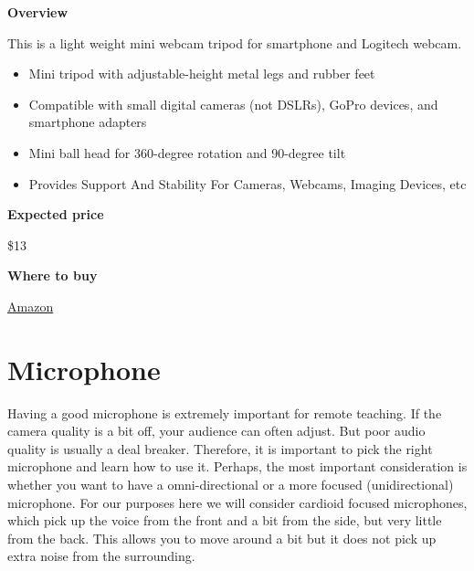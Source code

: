 \begin{gram}
\label{grm:equipment::tripod::mamawin::main}

\textbf{Overview}

This is a light weight mini webcam tripod for smartphone and Logitech webcam.
%
\begin{itemize}
\item
Mini tripod with adjustable-height metal legs and rubber feet

\item
Compatible with small digital cameras (not DSLRs), GoPro devices, and smartphone adapters 

\item
Mini ball head for 360-degree rotation and 90-degree tilt

\item
Provides Support And Stability For Cameras, Webcams, Imaging Devices, etc

\end{itemize}



\textbf{Expected price}

\$13

\textbf{Where to buy}

\href{https://www.amazon.com/Lightweight-Webcam-Tripod-Logitech-Camera/dp/B076SHC6RN/ref=sr_1_1_sspa?crid=2T6CQ3HNRR1XR&keywords=logitech+c920&qid=1582900721&s=electronics&sprefix=logitech+c,electronics,172&sr=1-1-spons&psc=1&spLa=ZW5jcnlwdGVkUXVhbGlmaWVyPUE1VjVUUFpKTU83QUkmZW5jcnlwdGVkSWQ9QTA1NTk1OTVLT1IyTzdRRFVEWkImZW5jcnlwdGVkQWRJZD1BMDEyNzk2NzEyTDVSOEdSQ1QxTEgmd2lkZ2V0TmFtZT1zcF9hdGYmYWN0aW9uPWNsaWNrUmVkaXJlY3QmZG9Ob3RMb2dDbGljaz10cnVl}{Amazon}

\end{gram}

 
\section{Microphone}
\label{sec:equipment::mics}

\begin{gram}
\label{grm:equipment::mics::how}
Having a good microphone is extremely important for remote teaching. 
%
If the camera quality is a bit off, your audience  can often adjust.
%
But poor audio quality is usually a deal breaker.
%
Therefore, it is important to pick the right microphone and learn how to use it. 
%
Perhaps, the most important consideration is whether you want to have a
omni-directional or a more focused (unidirectional) microphone.
%
For our purposes here we will consider cardioid focused
microphones, which pick up the voice from the front and a bit from the
side, but very little from the back.  This allows you to move around a
bit but it does not pick up extra noise from the surrounding.
%
\end{gram}

